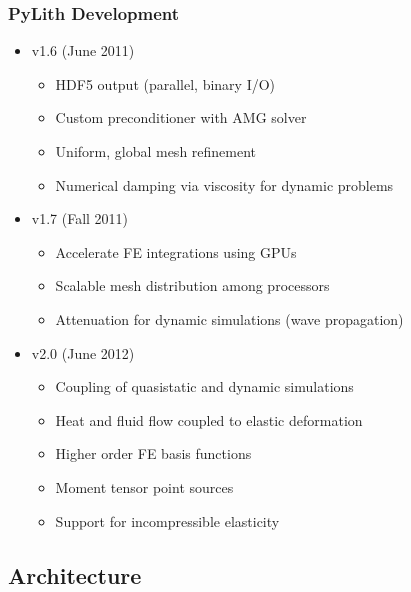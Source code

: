 \documentclass{beamer}
\begin{document}
\begin{frame}
  \frametitle{PyLith Development}

  \begin{itemize}
  \item v1.6 (June 2011)
    \begin{itemize}
    \item HDF5 output (parallel, binary I/O)
    \item Custom preconditioner with AMG solver
    \item Uniform, global mesh refinement
    \item Numerical damping via viscosity for dynamic problems
    \end{itemize}
  \item v1.7 (Fall 2011)
    \begin{itemize}
    \item Accelerate FE integrations using GPUs
    \item Scalable mesh distribution among processors
    \item Attenuation for dynamic simulations (wave propagation)
    \end{itemize}
  \item v2.0 (June 2012)
    \begin{itemize}
    \item Coupling of quasistatic and dynamic simulations
    \item Heat and fluid flow coupled to elastic deformation
    \item Higher order FE basis functions
    \item Moment tensor point sources
    \item Support for incompressible elasticity
   \end{itemize}
  \end{itemize}

\end{frame}


\subsection{Architecture}
\end{document}
